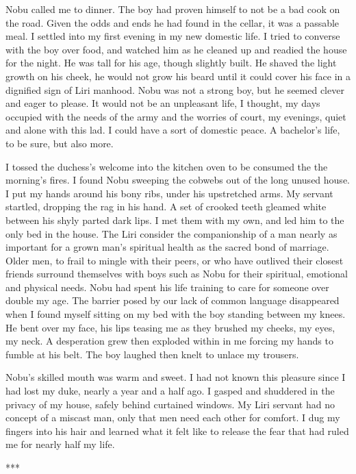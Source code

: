 \documentclass{article}
\begin{document}
Nobu called me to dinner. The boy had proven himself to not be a bad cook on the road. Given the odds and ends he had found in the cellar, it was a passable meal. I settled into my first evening in my new domestic life. I tried to converse with the boy over food, and watched him as he cleaned up and readied the house for the night. He was tall for his age, though slightly built. He shaved the light growth on his cheek, he would not grow his beard until it could cover his face in a dignified sign of Liri manhood. Nobu was not a strong boy, but he seemed clever and eager to please. It would not be an unpleasant life, I thought, my days occupied with the needs of the army and the worries of court, my evenings, quiet and alone with this lad. I could have a sort of domestic peace. A bachelor's life, to be sure, but also more. 

I tossed the duchess's welcome into the kitchen oven to be consumed the the morning's fires. I found Nobu sweeping the cobwebs out of the long unused house. I put my hands around his bony ribs, under his upstretched arms. My servant startled, dropping the rag in his hand. A set of crooked teeth gleamed white between his shyly parted dark lips. I met them with my own, and led him to the only bed in the house. The Liri consider the companionship of a man nearly as important for a grown man's spiritual health as the sacred bond of marriage. Older men, to frail to mingle with their peers, or who have outlived their closest friends surround themselves with boys such as Nobu for their spiritual, emotional and physical needs. Nobu had spent his life training to care for someone over double my age. The barrier posed by our lack of common language disappeared when I found myself sitting on my bed with the boy standing between my knees. He bent over my face, his lips teasing me as they brushed my cheeks, my eyes, my neck. A desperation grew then exploded within in me forcing my hands to fumble at his belt. The boy laughed then knelt to unlace my trousers.

Nobu's skilled mouth was warm and sweet. I had not known this pleasure since I had lost my duke, nearly a year and a half ago. I gasped and shuddered in the privacy of my house,  safely behind curtained windows. My Liri servant had no concept of a miscast man, only that men need each other for comfort. I dug my fingers into his hair and learned what it felt like to release the fear that had ruled me for nearly half my life. 


\vspace{.5cm}
***
\end{document}
